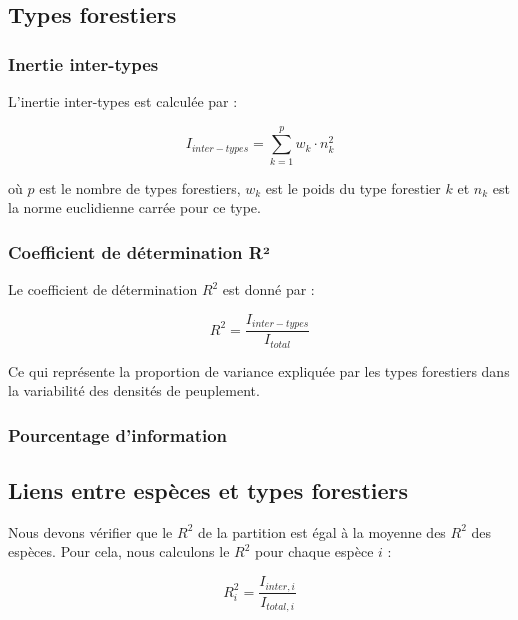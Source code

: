 \documentclass[
]{article}
\begin{document}
\hypertarget{types-forestiers}{%
\subsection{Types forestiers}\label{types-forestiers}}

\hypertarget{inertie-inter-types}{%
\subsubsection{Inertie inter-types}\label{inertie-inter-types}}

L'inertie inter-types est calculée par :

\[
I_{inter-types} = \sum_{k=1}^{p} w_{k} \cdot n_{k}^{2}
\]

où \(p\) est le nombre de types forestiers, \(w_{k}\) est le poids du
type forestier \(k\) et \(n_{k}\) est la norme euclidienne carrée pour
ce type.

\hypertarget{coefficient-de-duxe9termination-ruxb2}{%
\subsubsection{Coefficient de détermination
R²}\label{coefficient-de-duxe9termination-ruxb2}}

Le coefficient de détermination \(R^2\) est donné par :

\[
R^2 = \frac{I_{inter-types}}{I_{total}}
\]

Ce qui représente la proportion de variance expliquée par les types
forestiers dans la variabilité des densités de peuplement.

\hypertarget{pourcentage-dinformation}{%
\subsubsection{Pourcentage
d'information}\label{pourcentage-dinformation}}

\hypertarget{liens-entre-espuxe8ces-et-types-forestiers}{%
\subsection{Liens entre espèces et types
forestiers}\label{liens-entre-espuxe8ces-et-types-forestiers}}

Nous devons vérifier que le \(R^2\) de la partition est égal à la
moyenne des \(R^2\) des espèces. Pour cela, nous calculons le \(R^2\)
pour chaque espèce \(i\) :

\[
R^2_{i} = \frac{I_{inter,i}}{I_{total,i}}
\]
\end{document}
